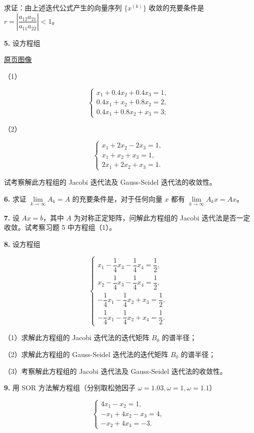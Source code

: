 \documentclass[
  10pt,
  fontset=fandol]{ctexart}
\begin{document}
求证：由上述迭代公式产生的向量序列 \(\{x^{(k)}\}\) 收敛的充要条件是 \(r=\left|\dfrac{a_{12}a_{21}}{a_{11}a_{22}}\right|<1\)。

\textbf{5.} 设方程组

\href{../../source-images/pdf-231.jpeg}{原页图像}

（1）

\[
\begin{cases}
x_1+0.4x_2+0.4x_3=1,\\
0.4x_1+x_2+0.8x_2=2,\\
0.4x_1+0.8x_2+x_3=3;
\end{cases}
\]

（2）

\[
\begin{cases}
x_1+2x_2-2x_3=1,\\
x_1+x_2+x_3=1,\\
2x_1+2x_2+x_3=1.
\end{cases}
\]

试考察解此方程组的 Jacobi 迭代法及 Gauss-Seidel 迭代法的收敛性。

\textbf{6.} 求证 \(\lim\limits_{k\to\infty}A_k=A\) 的充要条件是，对于任何向量 \(x\) 都有 \(\lim\limits_{k\to\infty}A_kx=Ax\)。

\textbf{7.} 设 \(Ax=b\)，其中 \(A\) 为对称正定矩阵，问解此方程组的 Jacobi 迭代法是否一定收敛。试考察习题 5 中方程组（1）。

\textbf{8.} 设方程组

\[
\begin{cases}
x_1-\dfrac14x_3-\dfrac14x_4=\dfrac12,\\[5pt]
x_2-\dfrac14x_3-\dfrac14x_4=\dfrac12,\\[5pt]
-\dfrac14x_1-\dfrac14x_2+x_3=\dfrac12,\\[5pt]
-\dfrac14x_1-\dfrac14x_2+x_4=\dfrac12.
\end{cases}
\]

（1）求解此方程组的 Jacobi 迭代法的迭代矩阵 \(B_0\) 的谱半径；

（2）求解此方程组的 Gauss-Seidel 迭代法的迭代矩阵 \(B_0\) 的谱半径；

（3）考察解此方程组的 Jacobi 迭代法及 Gauss-Seidel 迭代法的收敛性。

\textbf{9.} 用 SOR 方法解方程组（分别取松弛因子 \(\omega=1.03,\omega=1,\omega=1.1\)）

\[
\begin{cases}
4x_1-x_2=1,\\
-x_1+4x_2-x_3=4,\\
-x_2+4x_3=-3.
\end{cases}
\]
\end{document}
